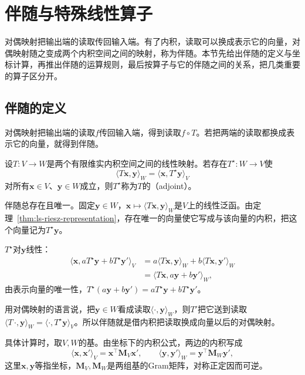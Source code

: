 
\section{伴随与特殊线性算子}
\label{sec:ls-adjoints}

对偶映射把输出端的读取传回输入端。有了内积，读取可以换成表示它的向量，对偶映射随之变成两个内积空间之间的映射，称为伴随。本节先给出伴随的定义与坐标计算，再推出伴随的运算规则，最后按算子与它的伴随之间的关系，把几类重要的算子区分开。

\subsection{伴随的定义}
\label{sec:ls-adjoint-definition}

对偶映射把输出端的读取$f$传回输入端，得到读取$f\circ T$。若把两端的读取都换成表示它的向量，就得到伴随。
\begin{definition}[伴随]
\label{def:linear-algebra-adjoint}
设$T:V\to W$是两个有限维实内积空间之间的线性映射。若存在$T^\star:W\to V$使
\begin{equation}
 \langle T\bm x,\bm y\rangle_W=\langle\bm x,T^\star\bm y\rangle_V
 \label{eq:ls-adjoint-pairing}
\end{equation}
对所有$\bm x\in V$、$\bm y\in W$成立，则$T^\star$称为$T$的（adjoint）。
\end{definition}

伴随总存在且唯一。固定$\bm y\in W$，$\bm x\mapsto\langle T\bm x,\bm y\rangle_W$是$V$上的线性泛函。由定理~\ref{thm:ls-riesz-representation}，存在唯一的向量使它写成与该向量的内积，把这个向量记为$T^\star\bm y$。

$T^\star$对$\bm y$线性：
\[
 \begin{aligned}
 \langle\bm x,aT^\star\bm y+bT^\star\bm y'\rangle_V
 &=a\langle T\bm x,\bm y\rangle_W+b\langle T\bm x,\bm y'\rangle_W\\
 &=\langle T\bm x,a\bm y+b\bm y'\rangle_W,
 \end{aligned}
\]
由表示向量的唯一性，$T^\star(a\bm y+b\bm y')=aT^\star\bm y+bT^\star\bm y'$。

用对偶映射的语言说，把$\bm y\in W$看成读取$\langle\cdot,\bm y\rangle_W$，则$T'$把它送到读取$\langle T\,\cdot,\bm y\rangle_W=\langle\cdot,T^\star\bm y\rangle_V$。所以伴随就是借内积把读取换成向量以后的对偶映射。

具体计算时，取$V,W$的基。由坐标下的内积公式，两边的内积写成
\[
 \langle\bm x,\bm x'\rangle_V=\bm x^\top\bm M_V\bm x',\qquad
 \langle\bm y,\bm y'\rangle_W=\bm y^\top\bm M_W\bm y',
\]
这里$\bm x,\bm y$等指坐标，$\bm M_V,\bm M_W$是两组基的Gram矩阵，对称正定因而可逆。

